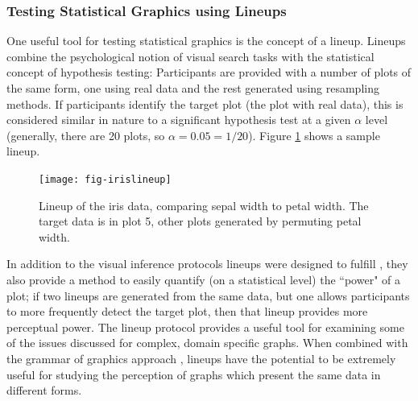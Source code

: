 \documentclass[11pt]{isuthesis}\usepackage[]{graphicx}\usepackage[]{color}
\newcommand\chaptocbreak{
	\addtocontents{toc}{\protect\needspace{4\baselineskip}}
	\addtocontents{lof}{\protect\needspace{2\baselineskip}}
	\addtocontents{lot}{\protect\needspace{2\baselineskip}}
}
\begin{document}
\subsubsection{Testing Statistical Graphics using Lineups}
One useful tool for testing statistical graphics is the concept of a lineup. Lineups combine the psychological notion of visual search tasks with the statistical concept of hypothesis testing: Participants are provided with a number of plots of the same form, one using real data and the rest generated using resampling methods. If participants identify the target plot (the plot with real data), this is considered similar in nature to a significant hypothesis test at a given $\alpha$ level (generally, there are 20 plots, so $\alpha=0.05 = 1/20$). Figure \ref{fig:lineupexample} shows a sample lineup. 



\begin{figure}[htbp]\centering
\texttt{[image: fig-irislineup]}
\caption[Lineup for testing statistical graphics]{Lineup of the iris data, comparing sepal width to petal width. The target data is in plot 5, other plots generated by permuting petal width.}\label{fig:lineupexample}
\end{figure}
In addition to the visual inference protocols lineups were designed to fulfill \citep{buja2009statistical}, they also provide a method to easily quantify (on a statistical level) the ``power" of a plot; if two lineups are generated from the same data, but one allows participants to more frequently detect the target plot, then that lineup provides more perceptual power. The lineup protocol provides a useful tool for examining some of the issues discussed for complex, domain specific graphs. When combined with the grammar of graphics approach \citep{wickham2010graphical}, lineups have the potential to be extremely useful for studying the perception of graphs which present the same data in different forms.
\chaptocbreak


\graphicspath{{Figure/sineIllusion/}{Images/sineIllusion/}}
\renewcommand{\floatpagefraction}{.99}

\newcommand{\range}[1]{{\text{range}\left(#1\right)}}
\newcommand{\s}[2]{{_{#1}s^{ #2}}}
\newcommand{\atan}[1]{\text{atan}\left({#1}\right)}
\newcommand{\xR}{\mathbb{R}}
\end{document}

